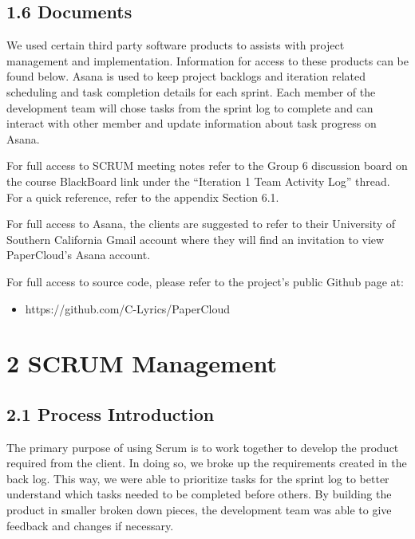\documentclass[]{article}
\begin{document}
\subsection{1.6 Documents}\label{documents}

We used certain third party software products to assists with project
management and implementation. Information for access to these products
can be found below. Asana is used to keep project backlogs and iteration
related scheduling and task completion details for each sprint. Each
member of the development team will chose tasks from the sprint log to
complete and can interact with other member and update information about
task progress on Asana.

For full access to SCRUM meeting notes refer to the Group 6 discussion
board on the course BlackBoard link under the ``Iteration 1 Team
Activity Log'' thread. For a quick reference, refer to the appendix
Section 6.1.

For full access to Asana, the clients are suggested to refer to their
University of Southern California Gmail account where they will find an
invitation to view PaperCloud's Asana account.

For full access to source code, please refer to the project's public
Github page at:

\begin{itemize}
\itemsep1pt\parskip0pt
\item
  https://github.com/C-Lyrics/PaperCloud
\end{itemize}

\section{2 SCRUM Management}\label{scrum-management}

\subsection{2.1 Process Introduction}\label{process-introduction}

The primary purpose of using Scrum is to work together to develop the
product required from the client. In doing so, we broke up the
requirements created in the back log. This way, we were able to
prioritize tasks for the sprint log to better understand which tasks
needed to be completed before others. By building the product in smaller
broken down pieces, the development team was able to give feedback and
changes if necessary.
\end{document}
